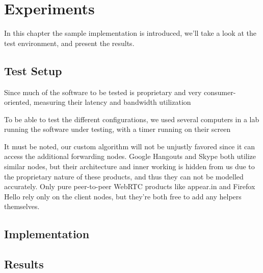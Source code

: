 \chapter{Experiments}\label{chp:experiments}

In this chapter the sample implementation is introduced, we'll take a look at the test environment, and present the results.

\section{Test Setup}

Since much of the software to be tested is proprietary and very consumer-oriented, measuring their latency and bandwidth utilization

To be able to test the different configurations, we used several computers in a lab running the software under testing, with a timer running on their screen

It must be noted, our custom algorithm will not be unjustly favored since it can access the additional forwarding nodes. Google Hangouts and Skype both utilize similar nodes, but their architecture and inner working is hidden from us due to the proprietary nature of these products, and thus they can not be modelled accurately. Only pure peer-to-peer WebRTC products like appear.in and Firefox Hello rely only on the client nodes, but they're both free to add any helpers themselves.


\section{Implementation}\label{sec:implementation}



\section{Results}

